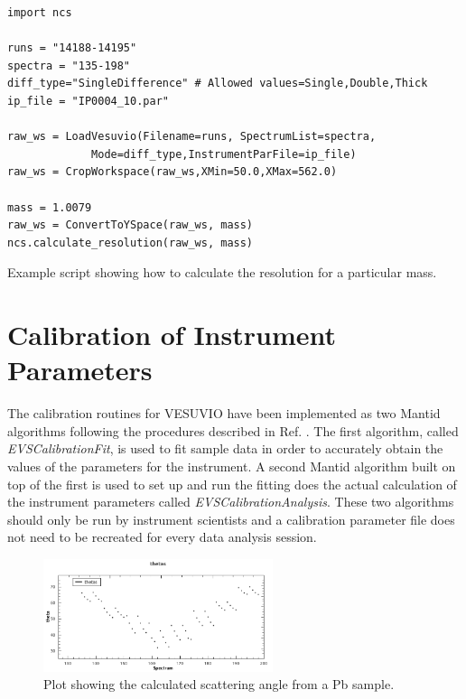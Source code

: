 \documentclass[paper=a4, fontsize=11pt]{scrartcl}	%
\numberwithin{equation}{section}															%
\numberwithin{figure}{section}																%
\numberwithin{table}{section}
\begin{document}
\begin{listing}[H]
\begin{verbatim}
import ncs

runs = "14188-14195"
spectra = "135-198"
diff_type="SingleDifference" # Allowed values=Single,Double,Thick
ip_file = "IP0004_10.par"

raw_ws = LoadVesuvio(Filename=runs, SpectrumList=spectra,
		     Mode=diff_type,InstrumentParFile=ip_file)
raw_ws = CropWorkspace(raw_ws,XMin=50.0,XMax=562.0)

mass = 1.0079
raw_ws = ConvertToYSpace(raw_ws, mass)
ncs.calculate_resolution(raw_ws, mass)
\end{verbatim}
\caption{Example script showing how to calculate the resolution for a particular mass.}
\label{lst:resolution}
\end{listing}

\section{Calibration of Instrument Parameters}
\label{sec:calibration}
The calibration routines for VESUVIO have been implemented as two Mantid algorithms following the procedures described in Ref. \cite{mayers2011calibration}. The first algorithm, called \textit{EVSCalibrationFit}, is used to fit sample data in order to accurately obtain the values of the parameters for the instrument. A second Mantid algorithm built on top of the first is used to set up and run the fitting does the actual calculation of the instrument parameters called \textit{EVSCalibrationAnalysis}. These two algorithms should only be run by instrument scientists and a calibration parameter file does not need to be recreated for every data analysis session.


\begin{figure}[H]
\centering
\includegraphics[width=0.6\textwidth]{img/calib-theta.png}
\caption{Plot showing the calculated scattering angle from a Pb sample.}
\label{fig:calib-theta}
\end{figure}
\end{document}
